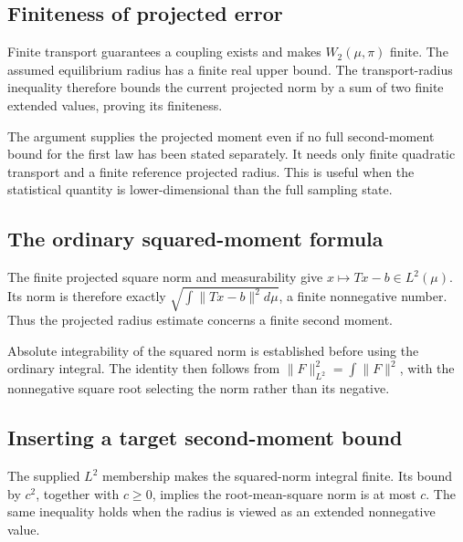 \documentclass[11pt,a4paper]{report}
\begin{document}
\subsection{\texorpdfstring{Finiteness of projected error}{Finiteness of projected error}}
\label{report-step-UnadjustedLangevin-Projection-lean-6}


Finite transport guarantees a coupling exists and makes \(W_2(\mu,\pi)\) finite. The assumed equilibrium radius has a finite real upper bound. The transport-radius inequality therefore bounds the current projected norm by a sum of two finite extended values, proving its finiteness.



The argument supplies the projected moment even if no full second-moment bound for the first law has been stated separately. It needs only finite quadratic transport and a finite reference projected radius. This is useful when the statistical quantity is lower-dimensional than the full sampling state.

\subsection{\texorpdfstring{The ordinary squared-moment formula}{The ordinary squared-moment formula}}
\label{report-step-UnadjustedLangevin-Projection-lean-7}


The finite projected square norm and measurability give \(x\mapsto Tx-b\in L^2(\mu)\). Its norm is therefore exactly \(\sqrt{\int\|Tx-b\|^2d\mu}\), a finite nonnegative number. Thus the projected radius estimate concerns a finite second moment.



Absolute integrability of the squared norm is established before using the ordinary integral. The identity then follows from \(\|F\|_{L^2}^2=\int\|F\|^2\), with the nonnegative square root selecting the norm rather than its negative.

\subsection{\texorpdfstring{Inserting a target second-moment bound}{Inserting a target second-moment bound}}
\label{report-step-UnadjustedLangevin-Projection-lean-8}


The supplied \(L^2\) membership makes the squared-norm integral finite. Its bound by \(c^2\), together with \(c\ge0\), implies the root-mean-square norm is at most \(c\). The same inequality holds when the radius is viewed as an extended nonnegative value.
\end{document}
